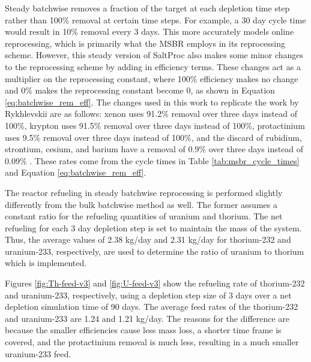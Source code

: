Steady batchwise removes a fraction of the target at each depletion time step rather than 100\% removal at certain time steps.
For example, a 30 day cycle time would result in 10\% removal every 3 days. This more accurately models online reprocessing, which is primarily what the MSBR employs in its reprocessing scheme. However, this steady version of SaltProc also makes some minor changes to the reprocessing scheme by adding in efficiency terms. These changes act as a multiplier on the reprocessing constant, where 100\% efficiency makes no change and 0\% makes the reprocessing constant become 0, as shown in Equation \eqref{eq:batchwise_rem_eff}. The changes used in this work to replicate the work by Rykhlevskii are as follows: xenon uses 91.2\% removal over three days instead of 100\%, krypton uses 91.5\% removal over three days instead of 100\%, protactinium uses 9.5\% removal over three days instead of 100\%, and the discard of rubidium, strontium, cesium, and barium have a removal of 0.9\% over three days instead of 0.09\% \cite{rykhlevskii_fuel_2020, rykhlevskii_saltproc_2018}. These rates come from the cycle times in Table \ref{tab:msbr_cycle_times} and Equation \eqref{eq:batchwise_rem_eff}.

The reactor refueling in steady batchwise reprocessing is performed slightly differently from the bulk batchwise method as well. The former assumes a constant ratio for the refueling quantities of uranium and thorium. The net refueling for each 3 day depletion step is set to maintain the mass of the system. Thus, the average values of 2.38 kg/day and 2.31 kg/day for thorium-232 and uranium-233, respectively, are used to determine the ratio of uranium to thorium which is implemented.

Figures \ref{fig:Th-feed-v3} and \ref{fig:U-feed-v3} show the refueling rate of thorium-232 and uranium-233, respectively, using a depletion step size of 3 days over a net depletion simulation time of 90 days. The average feed rates of the thorium-232 and uranium-233 are 1.24 and 1.21 kg/day. The reasons for the difference are because the smaller efficiencies cause less mass loss, a shorter time frame is covered, and the protactinium removal is much less, resulting in a much smaller uranium-233 feed.

